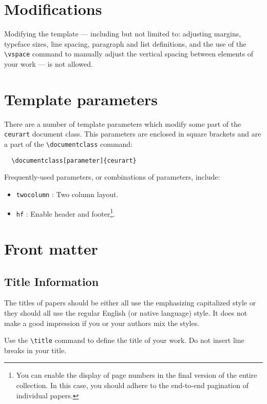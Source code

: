 \documentclass[
 twocolumn,
 hf,
]{ceurart}
\begin{document}
\section{Modifications}

Modifying the template --- including but not limited to: adjusting
margins, typeface sizes, line spacing, paragraph and list definitions,
and the use of the \verb|\vspace| command to manually adjust the
vertical spacing between elements of your work --- is not allowed.

\section{Template parameters}

There are a number of template
parameters which modify some part of the \verb|ceurart| document class.
This parameters are enclosed in square
brackets and are a part of the \verb|\documentclass| command:
\begin{lstlisting}
  \documentclass[parameter]{ceurart}
\end{lstlisting}

Frequently-used parameters, or combinations of parameters, include:
\begin{itemize}
\item \verb|twocolumn| : Two column layout.
\item \verb|hf| : Enable header and footer\footnote{You can enable
    the display of page numbers in the final version of the entire
    collection. In this case, you should adhere to the end-to-end
    pagination of individual papers.}.
\end{itemize}

\section{Front matter}

\subsection{Title Information}

The titles of papers should be either all use the emphasizing
capitalized style or they should all use the regular English (or
native language) style. It does not make a good impression if you or
your authors mix the styles.

Use the \verb|\title| command to define the title of your work. Do not
insert line breaks in your title.
\end{document}
